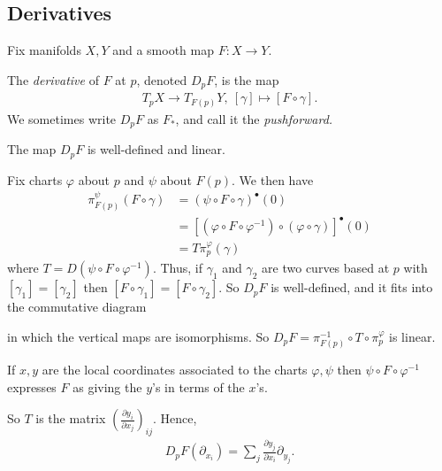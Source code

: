 \subsection{Derivatives} Fix manifolds $X,Y$ and a smooth map $F:X\to Y$.
\begin{defn}\label{defn:lec1.40}
	The \emph{derivative} of $F$ at $p$, denoted $D_pF$, is the map
	\begin{align*}
		T_pX \to T_{F(p)}Y, ~ [\gamma] \mapsto [F\circ \gamma].
	\end{align*}
	We sometimes write $D_pF$ as $F_*$, and call it the \emph{pushforward.}
\end{defn}
\begin{lem}\label{lem:1.41}
	The map $D_pF$ is well-defined and linear.
\end{lem}
\begin{prf}
	Fix charts $\varphi$ about $p$ and $\psi$ about $F(p)$. We then have
	\begin{align*}
		\pi^{\psi}_{F(p)}(F\circ \gamma) &= (\psi \circ F \circ \gamma)^\bullet(0) \\
										 &= [(\varphi\circ F\circ \varphi^{-1}) \circ (\varphi\circ \gamma)]^\bullet (0) \\
										 &= T\pi_p^{\varphi}(\gamma)
	\end{align*}
	where $T = D(\psi \circ F \circ \varphi^{-1})$. Thus, if $\gamma_1$ and $\gamma_2$ are two curves based at $p$ with $[\gamma_1] = [\gamma_2]$ then $[F\circ \gamma_1] = [F\circ \gamma_2]$. So $D_p F$ is well-defined, and it fits into the commutative diagram
	\begin{center}
	\end{center}
	in which the vertical maps are isomorphisms. So $D_pF = \pi_{F(p)}^{-1} \circ T\circ \pi_p^\varphi$ is linear.
\end{prf}

\begin{rmk}\label{rmk:lec1.41}
	If $x,y$ are the local coordinates associated to the charts $\varphi, \psi$ then $\psi\circ F\circ \varphi^{-1}$ expresses $F$ as giving the $y$'s in terms of the $x$'s.

	So $T$ is the matrix $\left(\frac{\partial y_i}{\partial x_j}\right)_{ij}$. Hence,
	\begin{align*}
		D_p F(\partial_{x_i}) = \sum_j \frac{\partial y_j}{\partial x_i} \partial_{y_j}.
	\end{align*}
\end{rmk}

